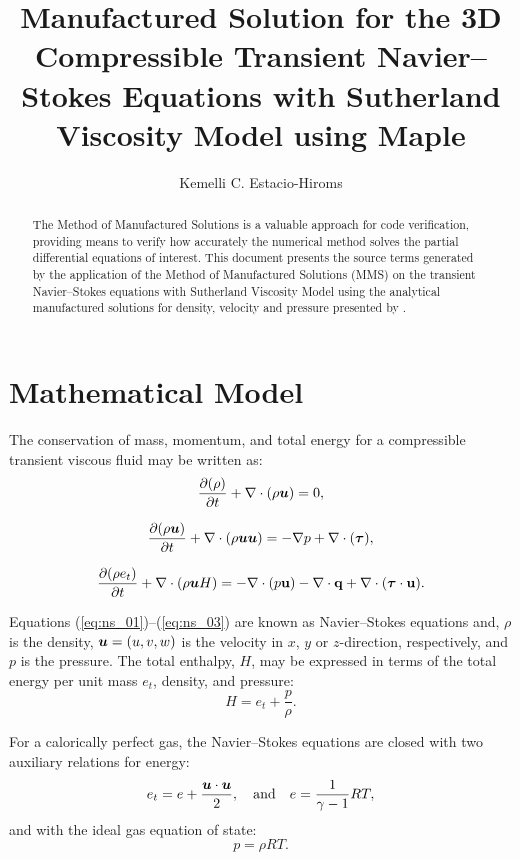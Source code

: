 \documentclass[10pt]{article}
\title{Manufactured Solution for the 3D Compressible Transient Navier--Stokes Equations with Sutherland Viscosity Model using Maple\texttrademark}
\author{Kemelli C. Estacio-Hiroms}
\newcommand{\Diff}[2] {\dfrac{\partial( #1)}{\partial #2}}
\newcommand{\bv}[1]{\ensuremath{\mbox{\boldmath$ #1 $}}}
\begin{document}
\maketitle

\begin{abstract}
The Method of Manufactured Solutions is a valuable approach for code verification, providing means to verify how accurately the numerical method solves the partial differential equations of interest.
This document presents the source terms generated by the application of the Method of Manufactured Solutions (MMS) on the transient Navier--Stokes equations  with Sutherland Viscosity Model using the analytical manufactured solutions for density, velocity and pressure presented by \citet{Roy2002}.
\end{abstract}





\section{Mathematical Model}
The conservation of mass, momentum, and total energy for a compressible transient viscous fluid may be written as:
\begin{equation}
 \label{eq:ns_01}
\Diff{\rho}{t} +\nabla \cdot \left(\rho \bv{u}\right) = 0,
\end{equation}

\begin{equation}
 \label{eq:ns_02}
\Diff{\rho \bv{u}}{t} +\nabla\cdot\left(\rho\bv{u}\bv{u}\right) = -\nabla p+  \nabla \cdot (\bv{\tau} ),
\end{equation}

\begin{equation}
 \label{eq:ns_03}
\Diff{\rho e_t}{t} +\nabla\cdot\left(\rho \bv{u} H\right) =-   \nabla\cdot(p  \mathbf{u}) -\nabla\cdot \mathbf{q} +  \nabla \cdot (\bv{\tau} \cdot \mathbf{u}).
\end{equation}


Equations (\ref{eq:ns_01})--(\ref{eq:ns_03}) are known as Navier--Stokes equations and, $\rho$ is the density, $\bv{u}=(u,v,w)$ is the velocity in $x$, $y$ or $z$-direction, respectively,    and $p$ is the pressure. The total enthalpy, $H$, may be expressed in terms of the total energy per unit mass $e_t$, density, and pressure:
$$H = e_t + \dfrac{p}{\rho}.$$

For a calorically perfect gas, the Navier--Stokes equations are closed with two auxiliary relations for energy:
\begin{equation}
 \label{eq:ns_04}
e_t= e+\dfrac{\bv{u}\cdot \bv{u}}{2},\quad\mbox{and}\quad e=\dfrac{1}{\gamma -1}RT ,
\end{equation}
and with the ideal gas equation of state:
\begin{equation}
 \label{eq:ns_05}
p=\rho RT.
\end{equation}
\end{document}
